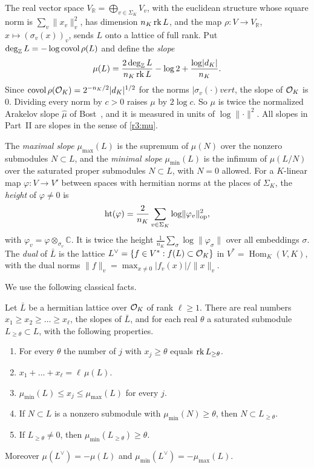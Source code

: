 The real vector space $V_{\mathbb R}=\bigoplus_{v\in\Sigma_K}V_v$, with the euclidean structure whose square norm is $\sum_v\lVert x_v\rVert_v^2$, has dimension $n_K\operatorname{rk} L$, and the map $\rho\colon V\to V_{\mathbb R}$, $x\mapsto(\sigma_v(x))_v$, sends $L$ onto a lattice of full rank. Put $\deg_{\mathbb Z}L=-\log\operatorname{covol}\rho(L)$ and define the \emph{slope}
\begin{equation}\label{r3:mu}
\mu(L)=\frac{2\deg_{\mathbb Z}L}{n_K\operatorname{rk} L}-\log2+\frac{\log\lvert d_K\rvert}{n_K}.
\end{equation}
Since $\operatorname{covol}\rho(\mathcal O_K)=2^{-n_K/2}\lvert d_K\rvert^{1/2}$ for the norms $\lvert\sigma_v(\cdot)
vert$, the slope of $\mathcal O_K$ is $0$. Dividing every norm by $c>0$ raises $\mu$ by $2\log c$. So $\mu$ is twice the normalized Arakelov slope $\widehat\mu$ of Bost~\cite{bost}, and it is measured in units of $\log\lVert\cdot\rVert^2$. All slopes in Part~II are slopes in the sense of \eqref{r3:mu}.

The \emph{maximal slope} $\mu_{\max}(L)$ is the supremum of $\mu(N)$ over the nonzero submodules $N\subset L$, and the \emph{minimal slope} $\mu_{\min}(L)$ is the infimum of $\mu(L/N)$ over the saturated proper submodules $N\subset L$, with $N=0$ allowed. For a $K$-linear map $\varphi\colon V\to V'$ between spaces with hermitian norms at the places of $\Sigma_K$, the \emph{height} of $\varphi\ne0$ is
\begin{equation}\label{r3:ht}
\operatorname{ht}(\varphi)=\frac2{n_K}\sum_{v\in\Sigma_K}\log\lVert\varphi_v\rVert_{\mathrm{op}}^2 ,
\end{equation}
with $\varphi_v=\varphi\otimes_{\sigma_v}\mathbb C$. It is twice the height $\frac1{n_K}\sum_\sigma\log\lVert\varphi_\sigma\rVert$ over all embeddings $\sigma$. The \emph{dual} of $\bar L$ is the lattice $L^\vee=\{f\in V^*:f(L)\subset\mathcal O_K\}$ in $V^*=\operatorname{Hom}_K(V,K)$, with the dual norms $\lVert f\rVert_v=\max_{x\ne0}\lvert f_v(x)\rvert/\lVert x\rVert_v$.

We use the following classical facts.

\begin{proposition}\label{r3:HN}
Let $\bar L$ be a hermitian lattice over $\mathcal O_K$ of rank $\ell\ge1$. There are real numbers $x_1\ge x_2\ge\dots\ge x_\ell$, the slopes of $\bar L$, and for each real $\theta$ a saturated submodule $L_{\ge\theta}\subset L$, with the following properties.
\begin{enumerate}
\item[(HN1)] For every $\theta$ the number of $j$ with $x_j\ge\theta$ equals $\operatorname{rk} L_{\ge\theta}$.
\item[(HN2)] $x_1+\dots+x_\ell=\ell\,\mu(L)$.
\item[(HN3)] $\mu_{\min}(L)\le x_j\le\mu_{\max}(L)$ for every $j$.
\item[(HN4)] If $N\subset L$ is a nonzero submodule with $\mu_{\min}(N)\ge\theta$, then $N\subset L_{\ge\theta}$.
\item[(HN5)] If $L_{\ge\theta}\ne0$, then $\mu_{\min}(L_{\ge\theta})\ge\theta$.
\end{enumerate}
Moreover $\mu(L^\vee)=-\mu(L)$ and $\mu_{\min}(L^\vee)=-\mu_{\max}(L)$.
\end{proposition}

